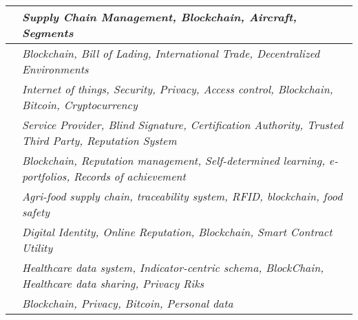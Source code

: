 \begin{longtable}{ |c|p{9cm}| }
	 \hline
 		\citet{2017_Madhwal} & \textit{Supply Chain Management, Blockchain, Aircraft, Segments} \\ 
	 \hline
	 \citet{2017_Naerland} & \textit{Blockchain, Bill of Lading, International Trade, Decentralized Environments}\\
	 \hline
	 \citet{2017_Ouaddah} & \textit{Internet of things, Security, Privacy, Access control, Blockchain, Bitcoin, Cryptocurrency} \\ 
	 \hline
	 \citet{2016_Schaub} & \textit{Service Provider, Blind Signature, Certification Authority, Trusted Third Party, Reputation System} \\
	 \hline
	 \citet{2016_Sharples} & \textit{Blockchain, Reputation management, Self-determined learning, e-portfolios, Records of achievement} \\ 
	 \hline
	 \citet{2016_Tian} & \textit{Agri-food supply chain, traceability system, RFID, blockchain, food safety} \\ 
	 \hline
	 \citet{2016_Yasin} & \textit{Digital Identity, Online Reputation, Blockchain, Smart Contract Utility}\\ 
	 \hline
	\citet{2016_Yue} & \textit{Healthcare data system, Indicator-centric schema, BlockChain, Healthcare data sharing, Privacy Riks}\\ 
	 \hline
	 \citet{2015_Zyskind} & \textit{Blockchain, Privacy, Bitcoin, Personal data} \\ 
	 \hline
\end{longtable}


